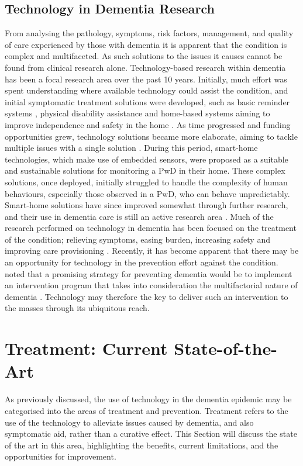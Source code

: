 \subsection{Technology in Dementia Research}
From analysing the pathology, symptoms, risk factors, management, and quality of care experienced by those with dementia it is apparent that the condition is complex and multifaceted. As such solutions to the issues it causes cannot be found from clinical research alone. Technology-based research within dementia has been a focal research area over the past 10 years. Initially, much effort was spent understanding where available technology could assist the condition, and initial symptomatic treatment solutions were developed, such as basic reminder systems \cite{Hersh1994, Wilson1997, Morris2003}, physical disability assistance \cite{Nugent2008b} and home-based systems aiming to improve independence and safety in the home \cite{Orpwood2005,Nugent2008b}. As time progressed and funding opportunities grew, technology solutions became more elaborate, aiming to tackle multiple issues with a single solution \cite{Zhang2008,Orpwood2005,Cook2007,Nugent2011}. During this period, smart-home technologies, which make use of embedded sensors, were proposed as a suitable and sustainable solutions for monitoring a PwD in their home. These complex solutions, once deployed, initially struggled to handle the complexity of human behaviours, especially those observed in a PwD, who can behave unpredictably. Smart-home solutions have since improved somewhat through further research, and their use in dementia care is still an active research area \cite{Amiribesheli2015,Wilson2015a}. Much of the research performed on technology in dementia has been focused on the treatment of the condition; relieving symptoms, easing burden, increasing safety and improving care provisioning \cite{xhafa2015, Gillespie2012, Cahill2008}. Recently, it has become apparent that there may be an opportunity for technology in the prevention effort against the condition. \citeauthor{Mangialasche2012} noted that a promising strategy for preventing dementia would be to implement an intervention program that takes into consideration the multifactorial nature of dementia \cite{Mangialasche2012}. Technology may therefore the key to deliver such an intervention to the masses through its ubiquitous reach.

\section{Treatment: Current State-of-the-Art} \label{section: treatment-stateoftheart}
As previously discussed, the use of technology in the dementia epidemic may be categorised into the areas of treatment and prevention. Treatment refers to the use of the technology to alleviate issues caused by dementia, and also symptomatic aid, rather than a curative effect.
This Section will discuss the state of the art in this area, highlighting the benefits, current limitations, and the opportunities for improvement.

